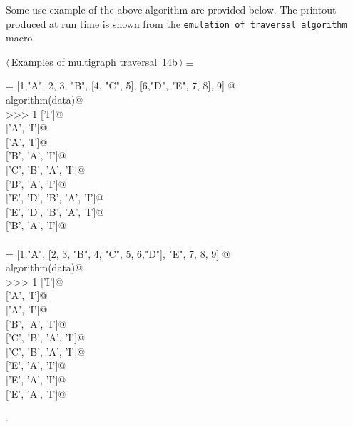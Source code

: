 \documentclass[11pt,oneside]{article}	%
\begin{document}
Some use example of the above algorithm are provided below. The printout produced at run time is shown from the \texttt{emulation of traversal algorithm} macro.
\begin{flushleft} \small \label{scrap27}
\protect{}$\langle\,$Examples of multigraph traversal\nobreak\ {\footnotesize 14b}$\,\rangle\equiv$
\vspace{-1ex}
\begin{list}{}{} \item
\mbox{}\verb@data = [1,"A", 2, 3, "B", [4, "C", 5], [6,"D", "E", 7, 8], 9]  @\\
\mbox{}\verb@print algorithm(data)@\\
\mbox{}\verb@>>> 1 ['I']@\\
\mbox{} ['A', 'I']@\\
\mbox{} ['A', 'I']@\\
\mbox{} ['B', 'A', 'I']@\\
\mbox{} ['C', 'B', 'A', 'I']@\\
\mbox{} ['B', 'A', 'I']@\\
\mbox{} ['E', 'D', 'B', 'A', 'I']@\\
\mbox{} ['E', 'D', 'B', 'A', 'I']@\\
\mbox{} ['B', 'A', 'I']@\\
\mbox{}\verb@@\\
\mbox{}\verb@data = [1,"A", [2, 3, "B", 4, "C", 5, 6,"D"], "E", 7, 8, 9]  @\\
\mbox{}\verb@print algorithm(data)@\\
\mbox{}\verb@>>> 1 ['I']@\\
\mbox{} ['A', 'I']@\\
\mbox{} ['A', 'I']@\\
\mbox{} ['B', 'A', 'I']@\\
\mbox{} ['C', 'B', 'A', 'I']@\\
\mbox{} ['C', 'B', 'A', 'I']@\\
\mbox{} ['E', 'A', 'I']@\\
\mbox{} ['E', 'A', 'I']@\\
\mbox{} ['E', 'A', 'I']@\\
\mbox{}\verb@@{\NWsep}
\end{list}
\vspace{-1ex}
\footnotesize\addtolength{\baselineskip}{-1ex}
\begin{list}{}{\setlength{\itemsep}{-\parsep}\setlength{\itemindent}{-\leftmargin}}
\item {\NWtxtMacroNoRef}.
\end{list}
\end{flushleft}
\end{document}
